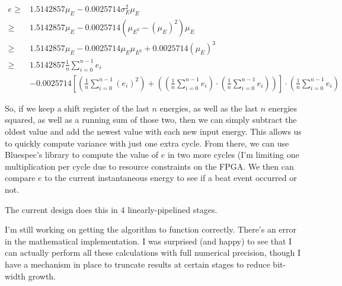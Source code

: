 \documentclass[letterpaper]{article}
\begin{document}
    \begin{align}
        e \geq & 1.5142857 \mu_E  - 0.0025714 \sigma^2_E \mu_E \\
          \geq & 1.5142857 \mu_E
                 - 0.0025714 (\mu_{E^2} - (\mu_E)^2) \mu_E \\
          \geq & 1.5142857 \mu_E
                 - 0.0025714 \mu_E \mu_{E^2} 
                 + 0.0025714 (\mu_E)^3 \\
          \geq & 1.5142857 \frac{1}{n} \sum_{i=0}^{n-1} e_i \\
               & - 0.0025714 \left[
                                \left(\frac{1}{n} \sum_{i=0}^{n-1} (e_i)^2\right) +
                                \left(
                                    \left(\frac{1}{n} \sum_{i=0}^{n-1} e_i\right) \cdot
                                    \left(\frac{1}{n} \sum_{i=0}^{n-1} e_i\right)
                                \right)
                             \right] \cdot
                             \left(\frac{1}{n} \sum_{i=0}^{n-1} e_i\right)
    \end{align}


    So, if we keep a shift register of the last $n$ energies, as well as the
    last $n$ energies squared, as well as a running sum of those two, then we
    can simply subtract the oldest value and add the newest value with each new
    input energy.  This allows us to quickly compute variance with just one
    extra cycle.  From there, we can use Bluespec's  library to
    compute the value of $e$ in two more cycles (I'm limiting one
    multiplication per cycle due to resource constraints on the FPGA.  We then
    can compare $e$ to the current instantaneous energy to see if a beat event
    occurred or not.

    The current design does this in 4 linearly-pipelined stages.

    I'm still working on getting the algorithm to function correctly.  There's
    an error in the mathematical implementation.  I was surprised (and happy)
    to see that I can actually perform all these calculations with full
    numerical precision, though I have a mechanism in place to truncate results
    at certain stages to reduce bit-width growth.
\end{document}
